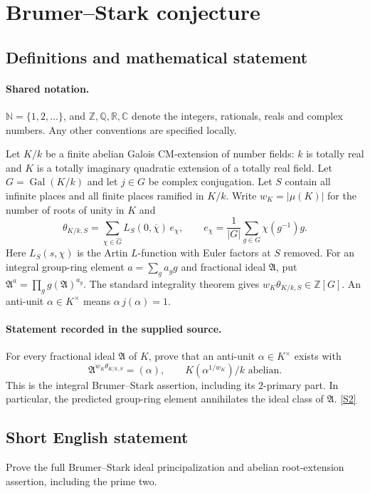 \documentclass[11pt]{article}
\newcommand{\sref}[2]{\hyperlink{source:#1:#2}{[S#2]}}
\begin{document}
\section{Brumer–Stark conjecture}\label{statement}

\subsection{Definitions and mathematical statement}

\paragraph{Shared notation.}$\mathbb N=\{1,2,\ldots\}$, and $\mathbb Z,\mathbb Q,\mathbb R,\mathbb C$ denote the integers, rationals, reals and complex numbers. Any other conventions are specified locally.


Let $K/k$ be a finite abelian Galois CM-extension of number fields: $k$ is totally real and $K$ is a totally imaginary quadratic extension of a totally real field. Let $G=\operatorname{Gal}(K/k)$ and let $j\in G$ be complex conjugation. Let $S$ contain all infinite places and all finite places ramified in $K/k$. Write $w_K=|\mu(K)|$ for the number of roots of unity in $K$ and
\[\theta_{K/k,S}=\sum_{\chi\in\widehat G}L_S(0,\overline\chi)\,e_\chi,\qquad e_\chi=\frac1{|G|}\sum_{g\in G}\chi(g^{-1})g.\]
Here $L_S(s,\chi)$ is the Artin $L$-function with Euler factors at $S$ removed. For an integral group-ring element $a=\sum_g a_g g$ and fractional ideal $\mathfrak A$, put $\mathfrak A^a=\prod_g g(\mathfrak A)^{a_g}$. The standard integrality theorem gives $w_K\theta_{K/k,S}\in\mathbb Z[G]$. An anti-unit $\alpha\in K^\times$ means $\alpha\,j(\alpha)=1$.
\paragraph{Statement recorded in the supplied source.}
For every fractional ideal $\mathfrak A$ of $K$, prove that an anti-unit $\alpha\in K^\times$ exists with
\[\mathfrak A^{w_K\theta_{K/k,S}}=(\alpha),\qquad K(\alpha^{1/w_K})/k\text{ abelian}.\]
This is the integral Brumer--Stark assertion, including its $2$-primary part. In particular, the predicted group-ring element annihilates the ideal class of $\mathfrak A$. \sref{statement}{2}
\subsection{Short English statement}
Prove the full Brumer--Stark ideal principalization and abelian root-extension assertion, including the prime two.
\end{document}
